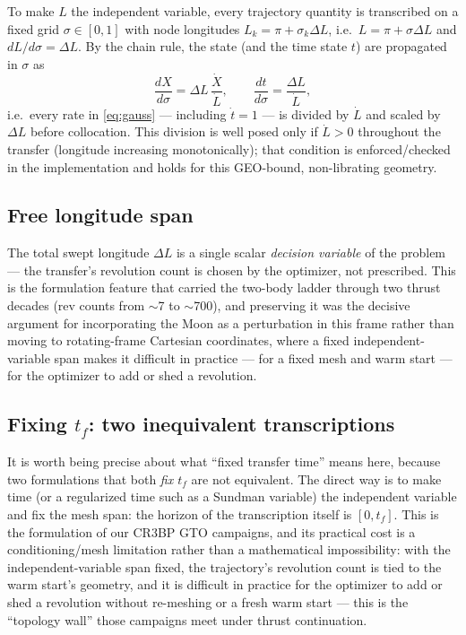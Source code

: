 \documentclass[11pt]{article}
\begin{document}
To make $L$ the independent variable, every trajectory quantity is
transcribed on a fixed grid $\sigma \in [0,1]$ with node longitudes
$L_k = \pi + \sigma_k \Delta L$, i.e.\ $L = \pi + \sigma \Delta L$ and
$dL/d\sigma = \Delta L$. By the chain rule, the state (and the time state
$t$) are propagated in $\sigma$ as
\begin{equation}
\label{eq:sigmadomain}
\frac{dX}{d\sigma} = \Delta L\,\frac{\dot X}{\dot L},
\qquad
\frac{dt}{d\sigma} = \frac{\Delta L}{\dot L},
\end{equation}
i.e.\ every rate in \eqref{eq:gauss} --- including $\dot t = 1$ --- is
divided by $\dot L$ and scaled by $\Delta L$ before collocation. This
division is well posed only if $\dot L > 0$ throughout the transfer
(longitude increasing monotonically); that condition is enforced/checked
in the implementation and holds for this GEO-bound, non-librating
geometry.

\subsection{Free longitude span}

The total swept longitude $\Delta L$ is a single scalar \emph{decision
variable} of the problem --- the transfer's revolution count is chosen by
the optimizer, not prescribed. This is the formulation feature that carried
the two-body ladder through two thrust decades (rev counts from
$\sim$7 to $\sim$700), and preserving it was the decisive argument for
incorporating the Moon as a perturbation in this frame rather than moving
to rotating-frame Cartesian coordinates, where a fixed independent-variable
span makes it difficult in practice --- for a fixed mesh and warm start ---
for the optimizer to add or shed a revolution.

\subsection{Fixing $t_f$: two inequivalent transcriptions}

It is worth being precise about what ``fixed transfer time'' means here,
because two formulations that both \emph{fix $t_f$} are not equivalent.
The direct way is to make time (or a regularized time such as a Sundman
variable) the independent variable and fix the mesh span: the horizon of
the transcription itself is $[0, t_f]$. This is the formulation of our
CR3BP GTO campaigns, and its practical cost is a conditioning/mesh
limitation rather than a mathematical impossibility: with the
independent-variable span fixed, the trajectory's revolution count is tied
to the warm start's geometry, and it is difficult in practice for the
optimizer to add or shed a revolution without re-meshing or a fresh warm
start --- this is the ``topology wall'' those campaigns meet under thrust
continuation.
\end{document}
